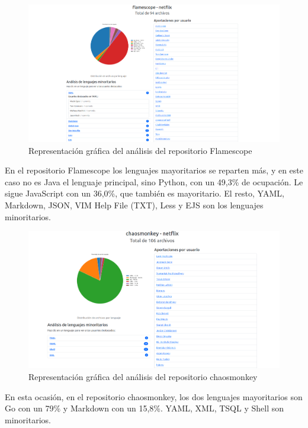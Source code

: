 \documentclass[a4paper, 12pt]{book}
\begin{document}
\begin{figure}[H]
  \centering
  \includegraphics[width=1\textwidth]{img/flamescope.png}
  \caption{Representación gráfica del análisis del repositorio Flamescope}
  \label{figura:analisisflamescope}
\end{figure}

En el repositorio Flamescope los lenguajes mayoritarios se reparten más, y en este caso no es Java el lenguaje principal, sino Python, con un 49,3\% de ocupación. Le sigue JavaScript con un 36,0\%, que también es mayoritario. El resto, YAML, Markdown, JSON, VIM Help File (TXT), Less y EJS son los lenguajes minoritarios.

\begin{figure}[H]
  \centering
  \includegraphics[width=1\textwidth]{img/chaosmonkey.png}
  \caption{Representación gráfica del análisis del repositorio chaosmonkey}
  \label{figura:analisischaosmonkey}
\end{figure}

En esta ocasión, en el repositorio chaosmonkey, los dos lenguajes mayoritarios son Go con un 79\% y Markdown con un 15,8\%. YAML, XML, TSQL y Shell son minoritarios.
\end{document}
